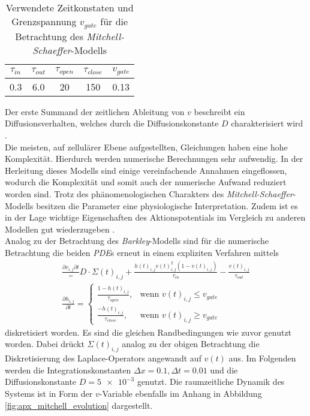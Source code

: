 \begin{table}[H]
\centering
\begin{tabular}{ccccc}
\hline 
$\tau_{in}$ & $\tau_{out}$ & $\tau_{open}$ & $\tau_{close}$ & $v_{gate}$ \\ 
\hline
0.3 & 6.0 & 20 & 150 & 0.13 \\ 
\hline 
\end{tabular} 
\caption{Verwendete Zeitkonstaten und Grenzspannung $v_{gate}$ für die Betrachtung des \textit{Mitchell-Schaeffer}-Modells}
\label{tab:ms_parameters}
\end{table}

Der erste Summand der zeitlichen Ableitung von $v$ beschreibt ein Diffusionsverhalten, welches durch die Diffusionskonstante $D$ charakterisiert wird \citep{talbot2013towards}.\\

Die meisten, auf zellulärer Ebene aufgestellten, Gleichungen haben eine hohe Komplexität. Hierdurch werden numerische Berechnungen sehr aufwendig. In der Herleitung dieses Modells sind einige vereinfachende Annahmen eingeflossen, wodurch die Komplexität und somit auch der numerische Aufwand reduziert worden sind. Trotz des phänomenologischen Charakters des \textit{Mitchell-Schaeffer}-Modells besitzen die Parameter eine physiologische Interpretation. Zudem ist es in der Lage wichtige Eigenschaften des Aktionspotentials im Vergleich zu anderen Modellen gut wiederzugeben \citep{talbot2013towards}.\\

Analog zu der Betrachtung des \textit{Barkley}-Modells sind für die numerische Betrachtung die beiden \textit{PDE}s erneut in einem expliziten Verfahren mittels
\begin{equation}
\begin{gathered}
\frac{\partial v_{i,j}{\partial t}} = D \cdot \Sigma(t)_{i,j} + \frac{h(t)_{i,j} v(t)_{i,j}^2(1-v(t)_{i,j})}{\tau_{in}} - \frac{v(t)_{i,j}}{\tau_{out}}\\
\frac{\partial h_{i,j}}{\partial t} = \begin{cases}
	\frac{1-h(t)_{i,j}}{\tau_{open}},& \text{wenn } v(t)_{i,j} \leq v_{gate}\\
    \frac{-h(t)_{i,j}}{\tau_{close}},& \text{wenn } v(t)_{i,j} \geq v_{gate}
\end{cases}
\end{gathered}
\end{equation}
diskretisiert worden. Es sind die gleichen Randbedingungen wie zuvor genutzt worden. Dabei drückt $\Sigma(t)_{i, j}$ analog zu der obigen Betrachtung die Diskretisierung des Laplace-Operators angewandt auf $v(t)$ aus. Im Folgenden werden die Integrationskonstanten $\Delta x = 0.1, \Delta t = 0.01$ und die Diffusionskonstante $D = \num{5e-3}$ genutzt. Die raumzeitliche Dynamik des Systems ist in Form der $v$-Variable ebenfalls im Anhang in Abbildung \ref{fig:apx_mitchell_evolution} dargestellt.\\